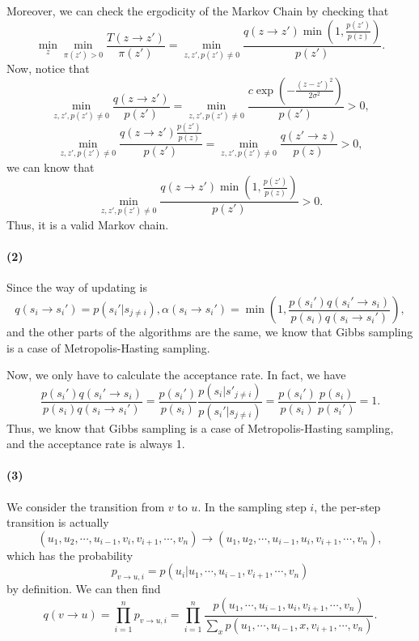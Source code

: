 \documentclass[a4 paper,12pt]{article}
\begin{document}
Moreover, we can check the ergodicity of the Markov Chain by checking that
\[
\min_z \min_{\pi(z')>0}\frac{T(z\to z')}{\pi(z')}=\min_{z,z',p(z')\ne 0}\frac{q(z\to z')\min\left(1,\frac{p(z')}{p(z)}\right)}{p(z')}.
\]Now, notice that
\[
\min_{z,z',p(z')\ne 0}\frac{q(z\to z')}{p(z')}=\min_{z,z',p(z')\ne 0}\frac{c\exp\left(-\frac{(z-z')^2}{2\sigma^2}\right)}{p(z')}>0,
\]
\[
\min_{z,z',p(z')\ne 0}\frac{q(z\to z')\frac{p(z')}{p(z)}}{p(z')}=\min_{z,z',p(z')\ne 0}\frac{q(z'\to z)}{p(z)}>0,
\]
we can know that 
\[
\min_{z,z',p(z')\ne 0}\frac{q(z\to z')\min\left(1,\frac{p(z')}{p(z)}\right)}{p(z')}>0	.
\]Thus, it is a valid Markov chain.
\paragraph*{(2)}
Since the way of updating is
\[
q(s_i\to s_i')=p(s_i'|s_{j\ne i}),\alpha(s_i\to s_i')=\min\left(1,\frac{p(s_i')q(s_i'\to s_i)}{p(s_i)q(s_i\to s_i')}\right),
\]and the other parts of the algorithms are the same, we know that Gibbs sampling is a case of Metropolis-Hasting sampling.

Now, we only have to calculate the acceptance rate. In fact,  we have
\[
\frac{p(s_i')q(s_i'\to s_i)}{p(s_i)q(s_i\to s_i')}=\frac{p(s_i')}{p(s_i)}\frac{p(s_i|s'_{j\ne i})}{p(s_i'|s_{j\ne i})}=\frac{p(s_i')}{p(s_i)}\frac{p(s_i)}{p(s_i')}=1.
\] Thus, we know that Gibbs sampling is a case of Metropolis-Hasting sampling, and the acceptance rate is always 1.
\paragraph*{(3)}
We consider the transition from $v$ to $u$. In the sampling step $i$, the per-step transition is actually
\[
	(u_1,u_2,\cdots ,u_{i-1},v_i,v_{i+1},\cdots ,v_{n})\to (u_1,u_2,\cdots ,u_{i-1},u_i,v_{i+1},\cdots,v_{n}),
\]  which has the probability
\[
p_{v\to u,i}={p(u_i|u_1,\cdots,u_{i-1},v_{i+1},\cdots,v_n)}
\] by definition. We can then find
\[
q(v\to u)=\prod_{i=1}^n p_{v\to u,i}=\prod_{i=1}^n\frac{p(u_1,\cdots,u_{i-1},u_i,v_{i+1},\cdots,v_n)}{\sum_{x}p(u_1,\cdots,u_{i-1},x,v_{i+1},\cdots,v_n)}.
\] 
\end{document}
